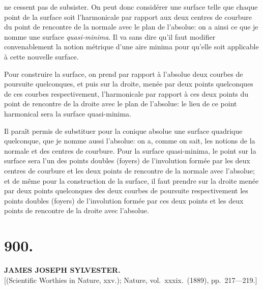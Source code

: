 \documentclass[11pt,a4paper]{book}
\begin{document}
ne cessent pas de subsister. On peut donc consid\'erer une surface telle que chaque point de la surface soit l'harmonicale par rapport aux deux centres de courbure du point de rencontre de la normale avec le plan de l'absolue: on a ainsi ce que je nomme une surface \emph{quasi-minima}. Il va sans dire qu'il faut modifier convenablement la notion m\'etrique d'une aire minima pour qu'elle soit applicable \`a cette nouvelle surface.

Pour construire la surface, on prend par rapport \`a l'absolue deux courbes de poursuite quelconques, et puis sur la droite, men\'ee par deux points quelconques de ces courbes respectivement, l'harmonicale par rapport \`a ces deux points du point de rencontre de la droite avec le plan de l'absolue: le lieu de ce point harmonical sera la surface quasi-minima.

Il para\^it permis de substituer pour la conique absolue une surface quadrique quelconque, que je nomme aussi l'absolue: on a, comme on sait, les notions de la normale et des centres de courbure. Pour la surface quasi-minima, le point sur la surface sera l'un des points doubles (foyers) de l'involution form\'ee par les deux centres de courbure et les deux points de rencontre de la normale avec l'absolue; et de m\^eme pour la construction de la surface, il faut prendre sur la droite men\'ee par deux points quelconques des deux courbes de poursuite respectivement les points doubles (foyers) de l'involution form\'ee par ces deux points et les deux points de rencontre de la droite avec l'absolue.


\section*{900.}
\begin{center}
{\large\bfseries JAMES JOSEPH SYLVESTER.}\\[0.5em]
\small [(Scientific Worthies in Nature, xxv.); Nature, vol.\ xxxix.\ (1889), pp.\ 217---219.]
\end{center}
\end{document}
